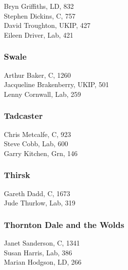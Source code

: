 \documentclass[a4paper,openany,10pt]{book}
\begin{document}


Bryn Griffiths, LD, 832\\
Stephen Dickins, C, 757\\
David Troughton, UKIP, 427\\
Eileen Driver, Lab, 421\\


\subsubsection*{Swale}



Arthur Baker, C, 1260\\
{Jacqueline Brakenberry}, UKIP, 501\\
Lenny Cornwall, Lab, 259\\


\subsubsection*{Tadcaster}



Chris Metcalfe, C, 923\\
Steve Cobb, Lab, 600\\
Garry Kitchen, Grn, 146\\


\subsubsection*{Thirsk}



Gareth Dadd, C, 1673\\
Jude Thurlow, Lab, 319\\


\subsubsection*{Thornton Dale and the Wolds}



Janet Sanderson, C, 1341\\
Susan Harris, Lab, 386\\
Marian Hodgson, LD, 266\\
\end{document}
